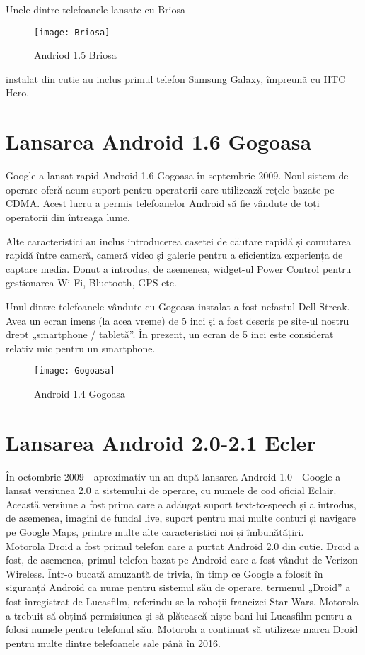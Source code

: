 \documentclass[a4paper,12pt]{amsbook}
\begin{document}
Unele dintre telefoanele lansate cu Briosa
\begin{figure}[h]
	\centering
	\texttt{[image: Briosa]}
	\caption[Briosa]{Andriod 1.5 Briosa}
	\label{fig:briosa}
\end{figure}
 instalat din cutie au inclus primul telefon Samsung Galaxy, împreună cu HTC Hero.
 \par
 \chapter{\Large Lansarea Android 1.6 Gogoasa}
 \par
Google a lansat rapid Android 1.6 Gogoasa în septembrie 2009. Noul sistem de operare oferă acum suport pentru operatorii care utilizează rețele bazate pe CDMA. Acest lucru a permis telefoanelor Android să fie vândute de toți operatorii din întreaga lume.

Alte caracteristici au inclus introducerea casetei de căutare rapidă și comutarea rapidă între cameră, cameră video și galerie pentru a eficientiza experiența de captare media. Donut a introdus, de asemenea, widget-ul Power Control pentru gestionarea Wi-Fi, Bluetooth, GPS etc.
\par
Unul dintre telefoanele vândute cu Gogoasa instalat a fost nefastul Dell Streak. Avea un ecran imens (la acea vreme) de 5 inci și a fost descris pe site-ul nostru drept „smartphone / tabletă”. În prezent, un ecran de 5 inci este considerat relativ mic pentru un smartphone.	
\par
\begin{figure}[h]
	\centering
	\texttt{[image: Gogoasa]}
	\caption[Gogoasa]{Android 1.4 Gogoasa}
	\label{fig:gogoasa}
\end{figure}
 \par
\chapter{\Large Lansarea Android 2.0-2.1 Ecler }
\par

În octombrie 2009 - aproximativ un an după lansarea Android 1.0 - Google a lansat versiunea 2.0 a sistemului de operare, cu numele de cod oficial Eclair. Această versiune a fost prima care a adăugat suport text-to-speech și a introdus, de asemenea, imagini de fundal live, suport pentru mai multe conturi și navigare pe Google Maps, printre multe alte caracteristici noi și îmbunătățiri.
\\
Motorola Droid a fost primul telefon care a purtat Android 2.0 din cutie. Droid a fost, de asemenea, primul telefon bazat pe Android care a fost vândut de Verizon Wireless. Într-o bucată amuzantă de trivia, în timp ce Google a folosit în siguranță Android ca nume pentru sistemul său de operare, termenul „Droid” a fost înregistrat de Lucasfilm, referindu-se la roboții francizei Star Wars. Motorola a trebuit să obțină permisiunea și să plătească niște bani lui Lucasfilm pentru a folosi numele pentru telefonul său. Motorola a continuat să utilizeze marca Droid pentru multe dintre telefoanele sale până în 2016.\\
\par
\end{document}
